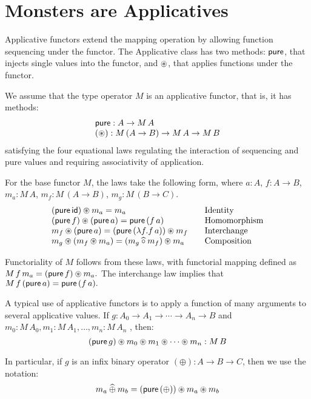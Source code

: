 \section{Monsters are Applicatives}

Applicative functors \cite{mcbride/paterson:2008}
extend the mapping operation by allowing function sequencing under the functor.
The Applicative class has two methods: $\mathsf{pure}$, that injects single values into the functor, and $\circledast$, that applies functions under the functor.

We assume that the type operator $M$ is an applicative functor, that is, it has methods:
$$
\begin{array}{l}
\mathsf{pure} : A \rightarrow M\,A\\
(\circledast): M\,(A\rightarrow B) \rightarrow M\,A \rightarrow M\,B
\end{array}
$$
satisfying the four equational laws regulating the interaction of sequencing and pure values and requiring associativity of application.

For the base functor $M$, the laws take the following form, where
 $a:A$, $f:A\rightarrow B$,
$m_a:M\,A$, $m_f:M\,(A\rightarrow B)$, $m_g:M\,(B\rightarrow C)$.
$$
\begin{array}{l@{\qquad}l}
(\apure\,\id) \appl m_a = m_a
  & \mbox{Identity} \\
(\apure\,f) \appl (\apure\,a) = \apure\,(f\,a)
  & \mbox{Homomorphism} \\
m_f \appl (\apure\,a) = (\apure\,(\lambda f. f\,a)) \appl m_f
  & \mbox{Interchange} \\
m_g \appl (m_f \appl m_a) = (m_g \alift{\comp} m_f) \appl m_a
  & \mbox{Composition}
\end{array}
$$

Functoriality of $M$ follows from these laws, with functorial mapping defined as
$
M\,f\,m_a = (\mathsf{pure}\,f) \circledast m_a.
$
The interchange law implies that
$
M\,f\,(\mathsf{pure}\,a) = \mathsf{pure}\,(f\,a).
$

A typical use of applicative functors is to apply a function of many arguments to several applicative values.
If $g:A_0\rightarrow A_1 \rightarrow \cdots \rightarrow A_n \rightarrow B$ and $m_0:M\,A_0, m_1:M\,A_1, \ldots, m_n:M\,A_n$ , then:
$$
(\mathsf{pure}\,g) \circledast m_0 \circledast m_1 \circledast \cdots \circledast m_n : M\,B
$$

In particular, if $g$ is an infix binary operator $(\oplus) : A \rightarrow B \rightarrow C$, then we use the notation:
$$
m_a \mathbin{\widehat{\oplus}} m_b = (\mathsf{pure}\,(\oplus)) \circledast m_a \circledast m_b
$$

